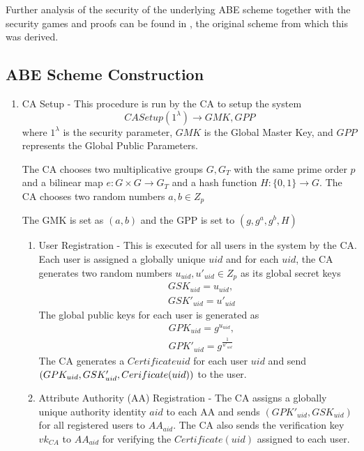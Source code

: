Further analysis of the security of the underlying ABE scheme together with the security games and proofs can be found in \cite{Yang2014}, the original scheme from which this was derived.


\subsection{ABE Scheme Construction}


\begin{enumerate}
	
	\item CA Setup - This procedure is run by the CA to setup the system $$ CASetup(1^{\lambda}) \longrightarrow GMK, GPP $$
	where $ 1^{\lambda} $ is the security parameter, $ GMK $ is the Global Master Key, and $ GPP $ represents the Global Public Parameters.
	
	The CA chooses two multiplicative groups $ G, G_{T} $ with the same prime order $ p $ and a bilinear map $ e \colon G \times G \rightarrow G_{T} $ and a hash function $ H \colon \{0, 1\} \rightarrow G. $ The CA chooses two random numbers $ a, b \in Z_{p} $
	
	The GMK is set as $ (a, b) $ and the GPP is set to $ (g, g^{a}, g^{b}, H) $
	
	\begin{enumerate}
		
		\item User Registration - This is executed for all users in the system by the CA. Each user is assigned a globally unique $ uid $ and for each $ uid $, the CA generates two random numbers $ u_{uid}, u'_{uid} \in Z_{p} $ as its global secret keys
		\begin{align*}
		&GSK_{uid} = u_{uid}, \\ &GSK'_{uid} = u'_{uid}
		\end{align*}
		The global public keys for each user is generated as 
		\begin{align*}
		&GPK_{uid} = g^{u_{uid}}, \\ &GPK'_{uid} = g^{\frac{1}{u'_{uid}}}
		\end{align*}
		The CA generates a $ Certificate{uid} $ for each user $ uid $ and send $ (GPK_{uid}, GSK'_{uid}, \\ Cerificate(uid)) $ to the user.
		
		\item Attribute Authority (AA) Registration - The CA assigns a globally unique authority identity $ aid $ to each AA and sends $ (GPK'_{uid}, GSK_{uid}) $ for all registered users to $ AA_{aid} $. The CA also sends the verification key $ vk_{CA} $ to $ AA_{aid} $ for verifying the $ Certificate(uid) $ assigned to each user.
		

\end{enumerate}
\end{enumerate}
